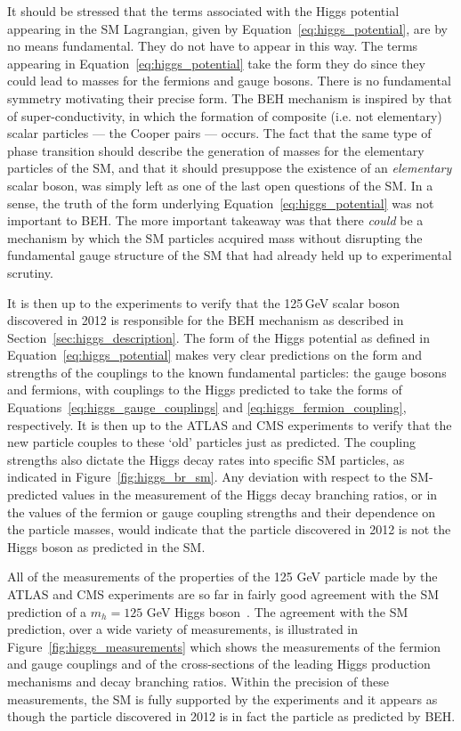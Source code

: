 It should be stressed that the terms associated with the Higgs potential appearing in the SM
Lagrangian, given by Equation~\ref{eq:higgs_potential}, are by no means fundamental.
They do not have to appear in this way.
The terms appearing in Equation~\ref{eq:higgs_potential} take the form they do since they
could lead to masses for the fermions and gauge bosons.
There is no fundamental symmetry motivating their precise form.
The BEH mechanism is inspired by that of super-conductivity, in which the formation of composite (i.e. not elementary)
scalar particles --- the Cooper pairs --- occurs.
The fact that the same type of phase transition should describe the generation of masses for
the elementary particles of the SM, and that it should presuppose the existence of an \textit{elementary}
scalar boson, was simply left as one of the last open questions of the SM.
In a sense, the truth of the form underlying Equation~\ref{eq:higgs_potential} was not important to BEH.
The more important takeaway was that there \textit{could} be a mechanism by which the SM particles acquired
mass without disrupting the fundamental gauge structure of the SM that had already held up to experimental scrutiny.

It is then up to the experiments to verify that the 125\,GeV scalar boson discovered in 2012
is responsible for the BEH mechanism as described in Section~\ref{sec:higgs_description}.
The form of the Higgs potential as defined in Equation~\ref{eq:higgs_potential} makes
very clear predictions on the form and strengths of the couplings to the known fundamental particles:
the gauge bosons and fermions, with couplings to the Higgs predicted to take the forms
of Equations~\ref{eq:higgs_gauge_couplings} and \ref{eq:higgs_fermion_coupling}, respectively.
It is then up to the ATLAS and CMS experiments to verify that the new particle couples
to these `old' particles just as predicted.
The coupling strengths also dictate the Higgs decay rates into specific SM particles, as indicated
in Figure~\ref{fig:higgs_br_sm}.
Any deviation with respect to the SM-predicted values in the measurement of the Higgs decay branching ratios, or
in the values of the fermion or gauge coupling strengths and their dependence on the
particle masses, would indicate that the particle discovered in 2012 is not the Higgs boson as predicted
in the SM.

All of the measurements of the properties of the 125 GeV particle
made by the ATLAS and CMS experiments are so far in fairly good agreement with the SM prediction
of a $m_h = 125$ GeV Higgs boson~\cite{HProp0,HProp1,HProp2,HProp3,HProp4,HProp5,HProp6,HProp7,HProp8}.
The agreement with the SM prediction, over a wide variety of measurements, is illustrated in
Figure~\ref{fig:higgs_measurements} which shows the measurements of the fermion and gauge
couplings and of the cross-sections of the leading Higgs production mechanisms and decay
branching ratios.
Within the precision of these measurements, the SM is fully supported by the experiments
and it appears as though the particle discovered in 2012 is in fact the particle as predicted
by BEH.

